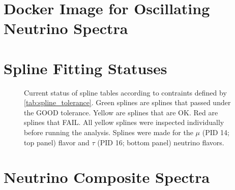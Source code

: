 \section{Docker Image for Oscillating Neutrino Spectra}\label{sec:apdx_nu_spec}


\clearpage

\section{Spline Fitting Statuses} \label{sec:apdx_nu_splines}

\begin{figure}[ht]
    \caption{Current status of spline tables according to contraints defined by \cref{tab:spline_tolerance}. Green splines are splines that passed under the GOOD tolerance. Yellow are splines that are OK. Red are splines that FAIL. All yellow splines were inspected individually before running the analysis. Splines were made for the $\mu$ (PID 14; top panel) flavor and $\tau$ (PID 16; bottom panel) neutrino flavors.}
    \label{fig:apdx_nu_splines}
\end{figure}

\clearpage

\section{Neutrino Composite Spectra} \label{sec:apdx_final_specs}

